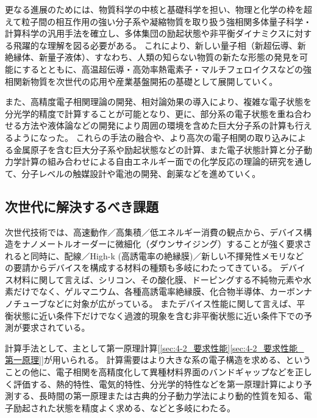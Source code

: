更なる進展のためには、物質科学の中核と基礎科学を担い、物理と化学の枠を超えて粒子間の相互作用の強い分子系や凝縮物質を取り扱う強相関多体量子科学・計算科学の汎用手法を確立し、多体集団の励起状態や非平衡ダイナミクスに対する飛躍的な理解を図る必要がある。
これにより、新しい量子相（新超伝導、新絶縁体、新量子液体）、すなわち、人類の知らない物質の新たな形態の発見を可能にするとともに、高温超伝導・高効率熱電素子・マルチフェロイクスなどの強相関新物質を次世代の応用や産業基盤開拓の基礎として展開していく。

また、高精度電子相関理論の開発、相対論効果の導入により、複雑な電子状態を分光学的精度で計算することが可能となり、更に、部分系の電子状態を重ね合わせる方法や液体論などの開発により周囲の環境を含めた巨大分子系の計算も行えるようになった。
これらの手法の融合や、より高次の電子相関の取り込みによる金属原子を含む巨大分子系や励起状態などの計算、また電子状態計算と分子動力学計算の組み合わせによる自由エネルギー面での化学反応の理論的研究を通して、分子レベルの触媒設計や電池の開発、創薬などを進めていく。


\subsection{次世代に解決するべき課題}

\newcommand\要求性能参照[1]{\ref{sec:4-2_要求性能}\ref{sec:4-2_要求性能_#1}}

次世代技術では、高速動作／高集積／低エネルギー消費の観点から、デバイス構造をナノメートルオーダーに微細化（ダウンサイジング）することが強く要求されると同時に、配線／High-k (高誘電率の絶縁膜)／新しい不揮発性メモリなどの要請からデバイスを構成する材料の種類も多岐にわたってきている。
デバイス材料に関して言えば、シリコン、その酸化膜、ドーピングする不純物元素や水素だけでなく、ゲルマニウム、各種高誘電率絶縁膜、化合物半導体、カーボンナノチューブなどに対象が広がっている。
またデバイス性能に関して言えば、平衡状態に近い条件下だけでなく過渡的現象を含む非平衡状態に近い条件下での予測が要求されている。

計算手法として、主として第一原理計算[\要求性能参照{第一原理}]が用いられる。
計算需要はより大きな系の電子構造を求める、ということの他に、電子相関を高精度化して異種材料界面のバンドギャップなどを正しく評価する、熱的特性、電気的特性、分光学的特性などを第一原理計算により予測する、長時間の第一原理または古典的分子動力学法により動的性質を知る、電子励起された状態を精度よく求める、などと多岐にわたる。

